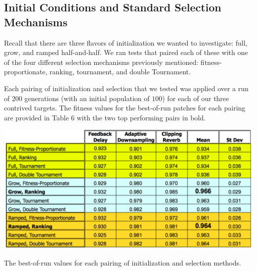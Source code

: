 \documentclass[12pt]{report} 	%
\numberwithin{figure}{chapter}
\numberwithin{table}{chapter}
\numberwithin{equation}{chapter}
\begin{document}
\begin{flushleft}
\vspace{12pt}
\subsection{Initial Conditions and Standard Selection Mechanisms}

Recall that there are three flavors of initialization we wanted to investigate: full, grow, and ramped half-and-half. We ran tests that paired each of these with one of the four different selection mechanisms previously mentioned: fitness-proportionate, ranking, tournament, and double Tournament.

Each pairing of initialization and selection that we tested was applied over a run of $200$ generations (with an initial population of $100$) for each of our three contrived targets. The fitness values for the best-of-run patches for each pairing are provided in Table 6 with the two top performing pairs in bold.
\begin{table}[h!]
\vspace{30pt}
\begin{center}
\includegraphics[scale=0.6,width=\linewidth]{InitializationTable1}
\caption[Initialization and selection best-of-run values]{The best-of-run values for each pairing of initialization and selection methods.}
\end{center}
\vspace{6pt}
\end{table}


\end{flushleft}
\end{document}
